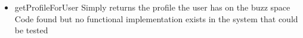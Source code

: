 \begin {itemize}
\begin {itemize}
\begin{figure}[h!]
  \centering
    \texttt{[image: buzzSpaceRegisterCode]} 
\end{figure}

\begin{figure}[h!]
  \centering
    \texttt{[image: addAdmin]} 
\end{figure}

\item{getProfileForUser}
Simply returns the profile the user has on the buzz space\\
Code found but no functional implementation exists in the system that could be tested \\
\end{itemize}
\end{itemize}
